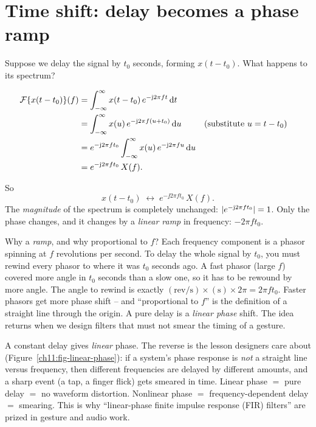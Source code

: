 \section{Time shift: delay becomes a phase ramp}
\label{ch11:time-shift}

Suppose we delay the signal by $t_0$
seconds, forming $x(t - t_0)$. What happens to its spectrum?

\begin{align}
\mathcal{F}\{x(t-t_0)\}(f)
&= \int_{-\infty}^{\infty} x(t-t_0)\, e^{-\mathrm{j} 2\pi f t}\, \mathrm{d} t \nonumber\\
&= \int_{-\infty}^{\infty} x(u)\, e^{-\mathrm{j} 2\pi f (u+t_0)}\, \mathrm{d} u
&&\text{(substitute } u = t - t_0\text{)} \nonumber\\
&= e^{-\mathrm{j} 2\pi f t_0} \int_{-\infty}^{\infty} x(u)\, e^{-\mathrm{j} 2\pi f u}\, \mathrm{d} u
\nonumber\\
&= e^{-\mathrm{j} 2\pi f t_0}\, X(f).
\label{ch11:time-shift-result}
\end{align}

So
\[
x(t - t_0) \;\longleftrightarrow\; e^{-\jj 2\pi f t_0}\, X(f).
\]
The \emph{magnitude} of the spectrum is completely unchanged:
$\lvert e^{-\mathrm{j} 2\pi f t_0}\rvert = 1$. Only the phase changes, and it changes by a
\emph{linear ramp} in frequency: $-2\pi f t_0$.

\begin{happeningbox}
Why a \emph{ramp}, and why proportional to $f$? Each frequency component is a
phasor spinning at $f$ revolutions per second. To delay the whole signal by
$t_0$, you must rewind every phasor to where it was $t_0$ seconds ago. A fast
phasor (large $f$) covered more angle in $t_0$ seconds than a slow one, so it has
to be rewound by more angle. The angle to rewind is exactly
$(\text{rev/s}) \times (\text{s}) \times 2\pi = 2\pi f t_0$. Faster phasors get
more phase shift -- and ``proportional to $f$'' is the definition of a straight
line through the origin. A pure delay is a \emph{linear phase} shift. The idea
returns when we design filters that must not smear the timing of
a gesture.
\end{happeningbox}

\begin{trapbox}
A constant delay gives \emph{linear} phase. The reverse is the lesson designers
care about (Figure~\ref{ch11:fig-linear-phase}): if a system's phase response is
\emph{not} a straight line versus frequency, then different frequencies are delayed by different amounts, and a
sharp event (a tap, a finger flick) gets smeared in time. Linear phase $=$ pure
delay $=$ no waveform distortion. Nonlinear phase $=$ frequency-dependent delay
$=$ smearing. This is why ``linear-phase finite impulse response (FIR) filters'' are prized in
gesture and audio work.
\end{trapbox}

